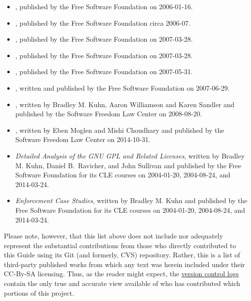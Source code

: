 \label{third-party-citation-list}
\begin{itemize}
\item {}, published by the Free
 Software Foundation on 2006-01-16.
\item {}, published by the Free
 Software Foundation circa 2006-07.
\item {}, published by the Free
 Software Foundation on 2007-03-28.
\item {}, published by the Free Software Foundation on 2007-03-28.
\item {}, published by the Free
 Software Foundation on 2007-05-31.
\item {}, written and published by the Free
 Software Foundation on 2007-06-29.
\item {}, written by Bradley M. Kuhn, Aaron
Williamson and Karen Sandler and published by the Software Freedom Law Center on 2008-08-20.
\item {}, written by Eben Moglen and Mishi Choudhary and published by the Software Freedom Law Center on 2014-10-31.
\item \textit{Detailed Analysis of the GNU GPL and Related Licenses}, written by
Bradley M. Kuhn, Daniel B.~Ravicher, and John Sullivan and published by the Free Software Foundation for its CLE courses on 2004-01-20,
2004-08-24, and 2014-03-24.
\item \textit{Enforcement Case Studies}, written by Bradley M. Kuhn and published by the Free
 Software Foundation for its CLE courses on 2004-01-20, 2004-08-24, and 2014-03-24.
\end{itemize}

Please note, however, that this list above does not include nor adequately
represent the substantial contributions from those who directly
contributed to this Guide using its Git (and formerly, CVS) repository.
Rather, this is a list of third-party published works from which any text was
herein included under their CC-By-SA licensing.  Thus, as the reader might
expect, the
\href{https://gitorious.org/copyleft-org/tutorial/history/master}{version
  control logs} contain the only true and accurate view available of who has
contributed which portions of this project.
